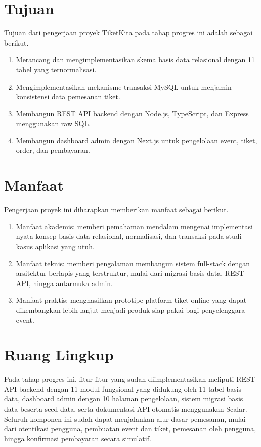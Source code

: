 \documentclass[12pt,a4paper]{report}
\begin{document}
\section{Tujuan}
Tujuan dari pengerjaan proyek TiketKita pada tahap progres ini adalah sebagai berikut.
\begin{enumerate}
    \item Merancang dan mengimplementasikan skema basis data relasional dengan 11 tabel yang ternormalisasi.
    \item Mengimplementasikan mekanisme transaksi MySQL untuk menjamin konsistensi data pemesanan tiket.
    \item Membangun REST API backend dengan Node.js, TypeScript, dan Express menggunakan raw SQL.
    \item Membangun dashboard admin dengan Next.js untuk pengelolaan event, tiket, order, dan pembayaran.
\end{enumerate}

\section{Manfaat}
Pengerjaan proyek ini diharapkan memberikan manfaat sebagai berikut.
\begin{enumerate}
    \item Manfaat akademis: memberi pemahaman mendalam mengenai implementasi nyata konsep basis data relasional, normalisasi, dan transaksi pada studi kasus aplikasi yang utuh.
    \item Manfaat teknis: memberi pengalaman membangun sistem full-stack dengan arsitektur berlapis yang terstruktur, mulai dari migrasi basis data, REST API, hingga antarmuka admin.
    \item Manfaat praktis: menghasilkan prototipe platform tiket online yang dapat dikembangkan lebih lanjut menjadi produk siap pakai bagi penyelenggara event.
\end{enumerate}

\section{Ruang Lingkup}
Pada tahap progres ini, fitur-fitur yang sudah diimplementasikan meliputi REST API backend dengan 11 modul fungsional yang didukung oleh 11 tabel basis data, dashboard admin dengan 10 halaman pengelolaan, sistem migrasi basis data beserta seed data, serta dokumentasi API otomatis menggunakan Scalar. Seluruh komponen ini sudah dapat menjalankan alur dasar pemesanan, mulai dari otentikasi pengguna, pembuatan event dan tiket, pemesanan oleh pengguna, hingga konfirmasi pembayaran secara simulatif.
\end{document}
